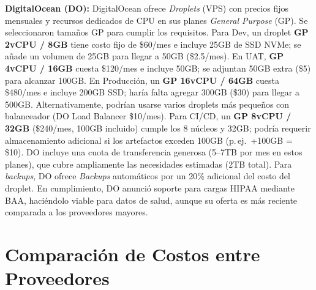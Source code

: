 \documentclass[12pt]{article}
\begin{document}
\textbf{DigitalOcean (DO):} DigitalOcean ofrece \emph{Droplets} (VPS) con precios fijos mensuales y recursos dedicados de CPU en sus planes \emph{General Purpose} (GP). Se seleccionaron tamaños GP para cumplir los requisitos. Para Dev, un droplet \textbf{GP 2vCPU / 8GB} tiene costo fijo de \$60/mes e incluye 25GB de SSD NVMe; se añade un volumen de 25GB para llegar a 50GB (\$2.5/mes). En UAT, \textbf{GP 4vCPU / 16GB} cuesta \$120/mes e incluye 50GB; se adjuntan 50GB extra (\$5) para alcanzar 100GB. En Producción, un \textbf{GP 16vCPU / 64GB} cuesta \$480/mes e incluye 200GB SSD; haría falta agregar 300GB (\$30) para llegar a 500GB. Alternativamente, podrían usarse varios droplets más pequeños con balanceador (DO Load Balancer \$10/mes). Para CI/CD, un \textbf{GP 8vCPU / 32GB} (\$240/mes, 100GB incluido) cumple los 8 núcleos y 32GB; podría requerir almacenamiento adicional si los artefactos exceden 100GB (p.\,ej.\ +100GB = \$10). DO incluye una cuota de transferencia generosa (5--7TB por mes en estos planes), que cubre ampliamente las necesidades estimadas (2TB total). Para \emph{backups}, DO ofrece \emph{Backups} automáticos por un 20\% adicional del costo del droplet. En cumplimiento, DO anunció soporte para cargas HIPAA mediante BAA, haciéndolo viable para datos de salud, aunque su oferta es más reciente comparada a los proveedores mayores.

\section{Comparación de Costos entre Proveedores}
\end{document}

